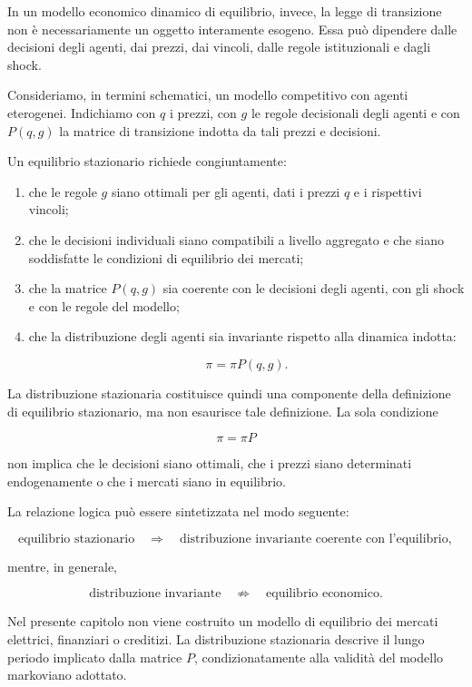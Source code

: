 In un modello economico dinamico di equilibrio, invece, la legge di
transizione non \`{e} necessariamente un oggetto interamente esogeno.
Essa pu\`{o} dipendere dalle decisioni degli agenti, dai prezzi, dai
vincoli, dalle regole istituzionali e dagli shock.

Consideriamo, in termini schematici, un modello competitivo con agenti
eterogenei. Indichiamo con \(q\) i prezzi, con \(g\) le regole
decisionali degli agenti e con \(P(q,g)\) la matrice di transizione
indotta da tali prezzi e decisioni.

Un equilibrio stazionario richiede congiuntamente:

\begin{enumerate}

\item che le regole \(g\) siano ottimali per gli agenti, dati i prezzi
\(q\) e i rispettivi vincoli;

\item che le decisioni individuali siano compatibili a livello
aggregato e che siano soddisfatte le condizioni di equilibrio dei
mercati;

\item che la matrice \(P(q,g)\) sia coerente con le decisioni degli
agenti, con gli shock e con le regole del modello;

\item che la distribuzione degli agenti sia invariante rispetto alla
dinamica indotta:

\[
\pi=\pi P(q,g).
\]
\end{enumerate}

La distribuzione stazionaria costituisce quindi una componente della
definizione di equilibrio stazionario, ma non esaurisce tale
definizione. La sola condizione

\[
\pi=\pi P
\]

non implica che le decisioni siano ottimali, che i prezzi siano
determinati endogenamente o che i mercati siano in equilibrio.

La relazione logica pu\`{o} essere sintetizzata nel modo seguente:

\[
\text{equilibrio stazionario}
\quad\Longrightarrow\quad
\text{distribuzione invariante coerente con l'equilibrio},
\]

mentre, in generale,

\[
\text{distribuzione invariante}
\quad\not\Longrightarrow\quad
\text{equilibrio economico}.
\]

Nel presente capitolo non viene costruito un modello di equilibrio dei
mercati elettrici, finanziari o creditizi. La distribuzione
stazionaria descrive il lungo periodo implicato dalla matrice \(P\),
condizionatamente alla validit\`{a} del modello markoviano adottato.

